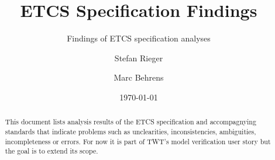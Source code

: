 \documentclass{template/openetcs_article}
\begin{document}
\frontmatter
{}






\title{ETCS Specification Findings}

\subtitle{Findings of ETCS specification analyses}

\date{\today}


\author{Stefan Rieger}


\author{Marc Behrens}







\begin{abstract}
  This document lists analysis results of the ETCS specification and accompagnying standards that indicate problems such as unclearities, inconsistencies, ambiguities, incompleteness or errors. For now it is part of TWT's model verification user story but the goal is to extend its scope.
\end{abstract}

\newcommand{\issue}[1]{\refstepcounter{issuecounter}\textbf{Issue \#\arabic{issuecounter} (#1):}}	
\end{document}
